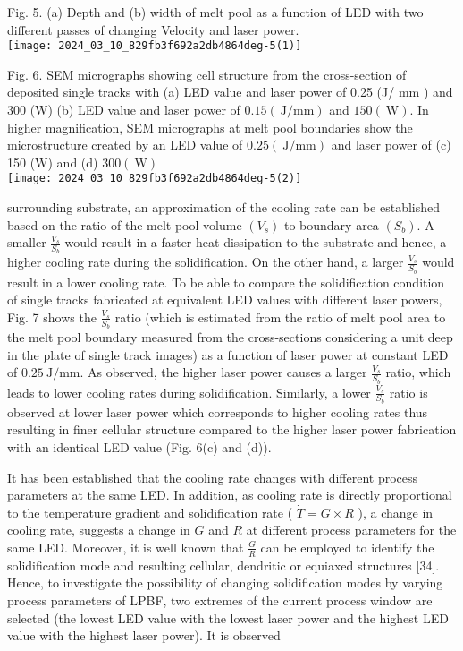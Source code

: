 \documentclass[10pt]{article}
\begin{document}
Fig. 5. (a) Depth and (b) width of melt pool as a function of LED with two different passes of changing Velocity and laser power.\\
\texttt{[image: 2024\_03\_10\_829fb3f692a2db4864deg-5(1)]}

Fig. 6. SEM micrographs showing cell structure from the cross-section of deposited single tracks with (a) LED value and laser power of 0.25 (J/ $\mathrm{mm}$ ) and 300 (W) (b) LED value and laser power of $0.15(\mathrm{~J} / \mathrm{mm})$ and $150(\mathrm{~W})$. In higher magnification, SEM micrographs at melt pool boundaries show the microstructure created by an LED value of $0.25(\mathrm{~J} / \mathrm{mm})$ and laser power of (c) 150 (W) and (d) $300(\mathrm{~W})$\\
\texttt{[image: 2024\_03\_10\_829fb3f692a2db4864deg-5(2)]}

surrounding substrate, an approximation of the cooling rate can be established based on the ratio of the melt pool volume $\left(V_{s}\right)$ to boundary area $\left(S_{b}\right)$. A smaller $\frac{V_{s}}{S_{b}}$ would result in a faster heat dissipation to the substrate and hence, a higher cooling rate during the solidification. On the other hand, a larger $\frac{V_{s}}{S_{b}}$ would result in a lower cooling rate. To be able to compare the solidification condition of single tracks fabricated at equivalent LED values with different laser powers, Fig. 7 shows the $\frac{V_{s}}{S_{b}}$ ratio (which is estimated from the ratio of melt pool area to the melt pool boundary measured from the cross-sections considering a unit deep in the plate of single track images) as a function of laser power at constant LED of $0.25 \mathrm{~J} / \mathrm{mm}$. As observed, the higher laser power causes a larger $\frac{V_{s}}{S_{b}}$ ratio, which leads to lower cooling rates during solidification. Similarly, a lower $\frac{V_{s}}{S_{b}}$ ratio is observed at lower laser power which corresponds to higher cooling rates thus resulting in finer cellular structure compared to the higher laser power fabrication with an identical LED value (Fig. 6(c) and (d)).

It has been established that the cooling rate changes with different process parameters at the same LED. In addition, as cooling rate is directly proportional to the temperature gradient and solidification rate ( $\dot{T}=G \times R$ ), a change in cooling rate, suggests a change in $G$ and $R$ at different process parameters for the same LED. Moreover, it is well known that $\frac{G}{R}$ can be employed to identify the solidification mode and resulting cellular, dendritic or equiaxed structures [34]. Hence, to investigate the possibility of changing solidification modes by varying process parameters of LPBF, two extremes of the current process window are selected (the lowest LED value with the lowest laser power and the highest LED value with the highest laser power). It is observed
\end{document}
